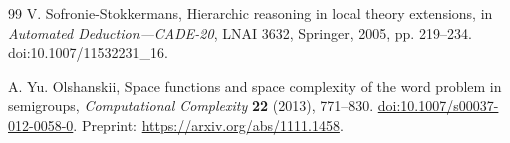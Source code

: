 \begin{thebibliography}{99}
V. Sofronie-Stokkermans,
Hierarchic reasoning in local theory extensions,
in \emph{Automated Deduction---CADE-20}, LNAI 3632, Springer, 2005, pp. 219--234.
\newblock doi:10.1007/11532231\_16.

A. Yu. Olshanskii,
Space functions and space complexity of the word problem in semigroups,
\emph{Computational Complexity} \textbf{22} (2013), 771--830.
\newblock \href{https://doi.org/10.1007/s00037-012-0058-0}{doi:10.1007/s00037-012-0058-0}. Preprint: \url{https://arxiv.org/abs/1111.1458}.

\end{thebibliography}

